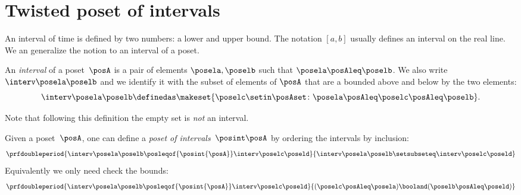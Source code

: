 
\section{Twisted poset of intervals}

An interval of time is defined by two numbers: a lower and upper bound.
The notation $[a,b]$ usually defines an interval on the real line.
We an generalize the notion to an interval of a poset.


\begin{definition}[Interval]
    \label{def:interval}
    An \emph{interval} of a poset~$\posA$ is a pair of elements $\posela, \poselb$ such that
    $\posela \posAleq \poselb$.
    We also write $\interv \posela \poselb$ and we identify
    it with the subset of elements of $\posA$ that are a bounded above and below by the two elements:
    \begin{equation*}
        \interv \posela \poselb
        \definedas
        \makeset{
            \poselc \setin \posAset \colon
            \posela \posAleq \poselc \posAleq \poselb
        }.
    \end{equation*}
\end{definition}

Note that following this definition the empty set is \emph{not} an interval.

\begin{definition}
    \label{def:poset_intervals}
    Given a poset~$\posA$, one can define a \emph{poset of intervals}~$\posint\posA$
    by ordering the intervals by inclusion:
    \begin{equation*}
        \prfdoubleperiod{
            \interv \posela \poselb
            \posleqof{\posint{\posA}}
            \interv \poselc \poseld
        }{
            \interv \posela \poselb
            \setsubseteq
            \interv \poselc \poseld
        }
    \end{equation*}
    Equivalently we only need check the bounds:
    \begin{equation*}
        \prfdoubleperiod{
            \interv \posela \poselb
            \posleqof{\posint{\posA}}
            \interv \poselc \poseld
        }{
            (\poselc \posAleq \posela ) \booland (\poselb \posAleq \poseld)
        }
    \end{equation*}

\end{definition}

